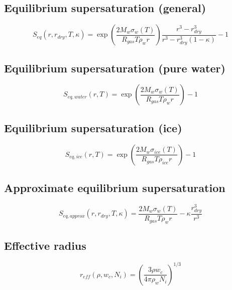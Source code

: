 \documentclass{article}
\begin{document}
\subsection*{Equilibrium supersaturation (general)}
\begin{equation}
S_{eq}(r,r_{dry},T,\kappa)=\exp\left(\frac{2M_w\sigma_w(T)}{R_{gas}T\rho_w r}\right)
\frac{r^{3}-r_{dry}^{3}}{r^{3}-r_{dry}^{3}(1-\kappa)}-1
\end{equation}

\subsection*{Equilibrium supersaturation (pure water)}
\begin{equation}
S_{eq,water}(r,T)=\exp\left(\frac{2M_w\sigma_w(T)}{R_{gas}T\rho_w r}\right)-1
\end{equation}

\subsection*{Equilibrium supersaturation (ice)}
\begin{equation}
S_{eq,ice}(r,T)=\exp\left(\frac{2M_w\sigma_{ice}(T)}{R_{gas}T\rho_{ice} r}\right)-1
\end{equation}

\subsection*{Approximate equilibrium supersaturation}
\begin{equation}
S_{eq,approx}(r,r_{dry},T,\kappa)=
\frac{2M_w\sigma_w(T)}{R_{gas}T\rho_w r}-\kappa\frac{r_{dry}^{3}}{r^{3}}
\end{equation}

\subsection*{Effective radius}
\begin{equation}
 r_{eff}(\rho,w_c,N_i)=\left(\frac{3\rho w_c}{4\pi\rho_w N_i}\right)^{1/3}
\end{equation}
\end{document}
